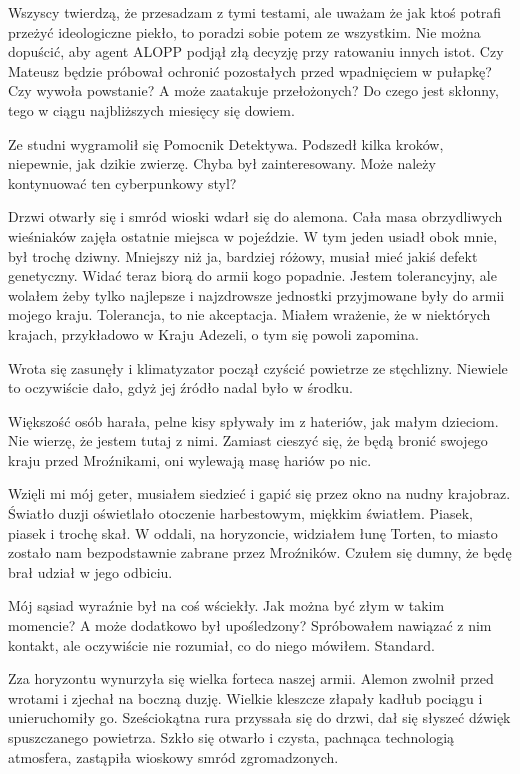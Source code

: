 Wszyscy twierdzą, że przesadzam z tymi testami, ale uważam że jak ktoś potrafi przeżyć ideologiczne piekło, to poradzi sobie potem ze wszystkim.
Nie można dopuścić, aby agent ALOPP podjął złą decyzję przy ratowaniu innych istot.
Czy Mateusz będzie próbował ochronić pozostałych przed wpadnięciem w pułapkę?
Czy wywoła powstanie?
A może zaatakuje przełożonych?
Do czego jest skłonny, tego w ciągu najbliższych miesięcy się dowiem.

\divider{}

Ze studni wygramolił się Pomocnik Detektywa.
Podszedł kilka kroków, niepewnie, jak dzikie zwierzę.
Chyba był zainteresowany. Może należy kontynuować ten cyberpunkowy styl?

\divider{}

Drzwi otwarły się i smród wioski wdarł się do alemona.
Cała masa obrzydliwych wieśniaków zajęła ostatnie miejsca w pojeździe.
W tym jeden usiadł obok mnie, był trochę dziwny.
Mniejszy niż ja, bardziej różowy, musiał mieć jakiś defekt genetyczny.
Widać teraz biorą do armii kogo popadnie.
Jestem tolerancyjny, ale wolałem żeby tylko najlepsze i najzdrowsze jednostki przyjmowane były do armii mojego kraju.
Tolerancja, to nie akceptacja.
Miałem wrażenie, że w niektórych krajach, przykładowo w Kraju Adezeli, o tym się powoli zapomina.

Wrota się zasunęły i klimatyzator począł czyścić powietrze ze stęchlizny. Niewiele to oczywiście dało, gdyż jej źródło nadal było w środku.

Większość osób harała, pelne kisy spływały im z hateriów, jak małym dzieciom.
Nie wierzę, że jestem tutaj z nimi. Zamiast cieszyć się, że będą bronić swojego kraju przed Mroźnikami, oni wylewają masę hariów po nic.

Wzięli mi mój geter, musiałem siedzieć i gapić się przez okno na nudny krajobraz.
Światło duzji oświetlało otoczenie harbestowym, miękkim światłem.
Piasek, piasek i trochę skał.
W oddali, na horyzoncie, widziałem łunę Torten, to miasto zostało nam bezpodstawnie zabrane przez Mroźników.
Czułem się dumny, że będę brał udział w jego odbiciu.

Mój sąsiad wyraźnie był na coś wściekły. 
Jak można być złym w takim momencie?
A może dodatkowo był upośledzony?
Spróbowałem nawiązać z nim kontakt, ale oczywiście nie rozumiał, co do niego mówiłem.
Standard.

Zza horyzontu wynurzyła się wielka forteca naszej armii.
Alemon zwolnił przed wrotami i zjechał na boczną duzję. 
Wielkie kleszcze złapały kadłub pociągu i unieruchomiły go.
Sześciokątna rura przyssała się do drzwi, dał się słyszeć dźwięk spuszczanego powietrza.
Szkło się otwarło i czysta, pachnąca technologią atmosfera, zastąpiła wioskowy smród zgromadzonych.


